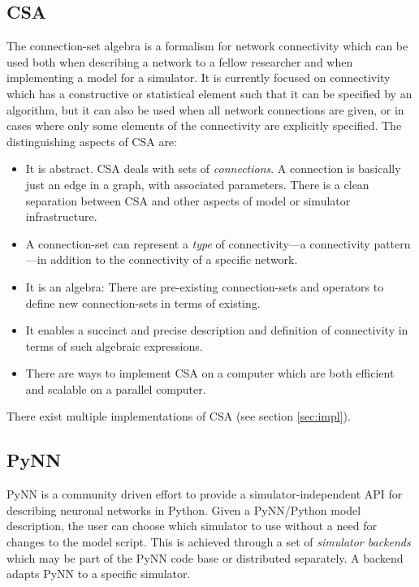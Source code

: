 \documentclass{frontiersSCNS} %
\begin{document}
\subsection{CSA}
The connection-set algebra \citep[CSA;][]{djurfeldt12} is a formalism
for network connectivity which can be used both when describing a
network to a fellow researcher and when implementing a model for a
simulator.  It is currently focused on connectivity which has a
constructive or statistical element such that it can be specified by
an algorithm, but it can also be used when all network connections are
given, or in cases where only some elements of the connectivity are
explicitly specified. The distinguishing aspects of CSA are:
\begin{itemize}
\item It is abstract. CSA deals with sets of \emph{connections}. A
  connection is basically just an edge in a graph, with associated
  parameters. There is a clean separation between CSA and other
  aspects of model or simulator infrastructure.
\item A connection-set can represent a \emph{type} of
  connectivity---a connectivity pattern---in addition to the connectivity
  of a specific network.
\item It is an algebra: There are pre-existing connection-sets and
  operators to define new connection-sets in terms of existing.
\item It enables a succinct and precise description and definition of
  connectivity in terms of such algebraic expressions.
\item There are ways to implement CSA on a computer which are both
  efficient and scalable on a parallel computer.
\end{itemize}
There exist multiple implementations of CSA (see section
\ref{sec:impl}).

\subsection{PyNN}\label{sec:pynn}

PyNN \citep[\url{http://www.neuralensemble.org/PyNN};][]{Davison09} is
a community driven effort to provide a simulator-independent API for
describing neuronal networks in Python. Given a PyNN/Python model
description, the user can choose which simulator to use without a need
for changes to the model script. This is achieved through a set of
\emph{simulator backends} which may be part of the PyNN code base or
distributed separately. A backend adapts PyNN to a specific simulator.
\end{document}
